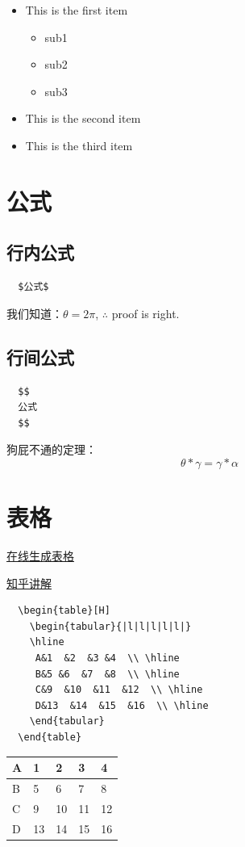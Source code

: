 \documentclass[onecolumn,oneside]{SUSTechHomework}
\begin{document}
\begin{itemize}
  \item This is the first item
  \begin{itemize}
    \item sub1
    \item sub2
    \item sub3
  \end{itemize}
  \item This is the second item
  \item This is the third item
\end{itemize}
\section{公式}
\subsection{行内公式}
\begin{lstlisting}
  $公式$
\end{lstlisting}
我们知道：$\theta=2\pi$, $\therefore$ proof is right.
\subsection{行间公式}
\begin{lstlisting}
  $$
  公式
  $$
\end{lstlisting}
狗屁不通的定理：
$$
\theta*\gamma=\gamma*\alpha
$$
\section{表格}
\href{https://www.tablesgenerator.com/}{在线生成表格} \par
\href{https://zhuanlan.zhihu.com/p/62317790}{知乎讲解}
\begin{lstlisting}
  \begin{table}[H]
    \begin{tabular}{|l|l|l|l|l|}
    \hline
     A&1  &2  &3 &4  \\ \hline
     B&5 &6  &7  &8  \\ \hline
     C&9  &10  &11  &12  \\ \hline
     D&13  &14  &15  &16  \\ \hline
    \end{tabular}
  \end{table}  
\end{lstlisting}
\begin{table}[H]
  \begin{tabular}{|l|l|l|l|l|}
  \hline
   A&1  &2  &3 &4  \\ \hline
   B&5 &6  &7  &8  \\ \hline
   C&9  &10  &11  &12  \\ \hline
   D&13  &14  &15  &16  \\ \hline
  \end{tabular}
\end{table}
\end{document}
